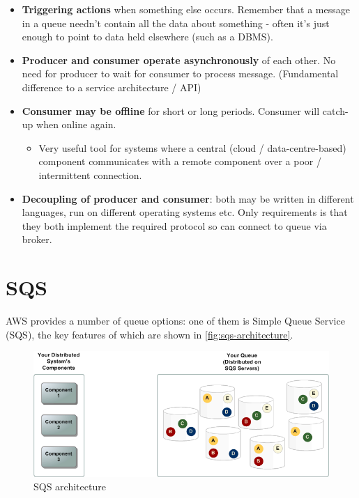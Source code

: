 \documentclass{pgnotes}
\begin{document}
\begin{itemize}
\item \textbf{Triggering actions} when something else occurs.  Remember that a message in a queue needn't contain all the data about something - often it's just enough to point to data held elsewhere (such as a DBMS).
\item \textbf{Producer and consumer operate asynchronously} of each other. No need for producer to wait for consumer to process message. (Fundamental difference to a service architecture / API)
\item \textbf{Consumer may be offline} for short or long periods.  Consumer will catch-up when online again. \begin{itemize}
  \item Very useful tool for systems where a central (cloud / data-centre-based) component communicates with a remote component over a poor / intermittent connection.
  \end{itemize}
\item \textbf{Decoupling of producer and consumer}: both may be written in different languages, run on different operating systems etc. Only requirements is that they both implement the required protocol so can connect to queue via broker.
\end{itemize}

\section{SQS}

AWS provides a number of queue options: one of them is Simple Queue Service (SQS), the key features of which are shown in \autoref{fig:sqs-architecture}.

\begin{figure}[htbp]
  \centering
  \includegraphics{sqs_architecture}
  \caption{SQS architecture}
  \label{fig:sqs-architecture}
\end{figure}
\end{document}
